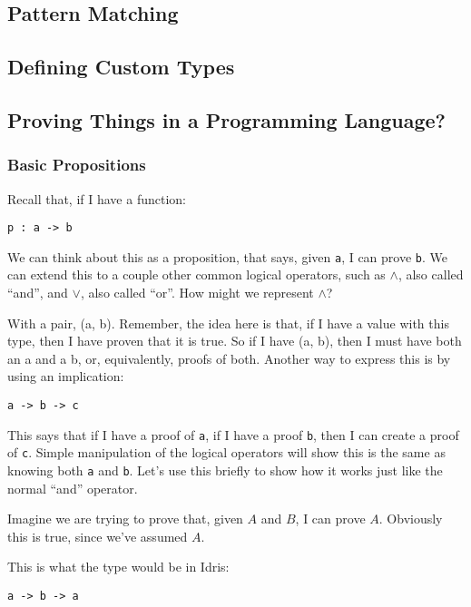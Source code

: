 \documentclass{article}
\newcommand{\inline}[1]{\texttt{#1}}
\begin{document}
\subsection{Pattern Matching}

\subsection{Defining Custom Types}

\subsection{Proving Things in a Programming Language?}
\subsubsection{Basic Propositions}

Recall that, if I have a function:

\begin{verbatim}
p : a -> b
\end{verbatim}

We can think about this as a proposition, that says, given \inline{a}, I can prove \inline{b}.
We can extend this to a couple other common logical operators, such as $\wedge$, also called ``and'', and $\vee$, also called ``or''.
How might we represent $\wedge$?

With a pair, (a, b). Remember, the idea here is that, if I have a value with this type, then I have proven that it is true. So if I have (a, b), then I must have both an a and a b, or, equivalently, proofs of both. Another way to express this is by using an implication:

\begin{verbatim}
a -> b -> c
\end{verbatim}

This says that if I have a proof of \inline{a}, if I have a proof \inline{b}, then I can create a proof of \inline{c}.
Simple manipulation of the logical operators will show this is the same as knowing both \inline{a} and \inline{b}. %
Let’s use this briefly to show how it works just like the normal ``and'' operator.

Imagine we are trying to prove that, given $A$ and $B$, I can prove $A$.
Obviously this is true, since we've assumed $A$.

This is what the type would be in Idris:
\begin{verbatim}
a -> b -> a
\end{verbatim}
\end{document}
